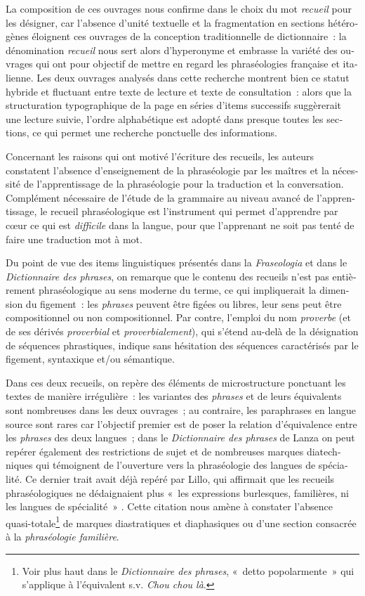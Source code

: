 \documentclass[output=paper,booklanguage=french]{langscibook}
\begin{document}
\begin{otherlanguage}{french}
La composition de ces ouvrages nous confirme dans le choix du mot \emph{recueil} pour les désigner, car l’absence d’unité textuelle et la fragmentation en sections hétérogènes éloignent ces ouvrages de la conception traditionnelle de dictionnaire~: la dénomination \emph{recueil} nous sert alors d’hyperonyme et embrasse la variété des ouvrages qui ont pour objectif de mettre en regard les phraséologies française et italienne. Les deux ouvrages analysés dans cette recherche montrent bien ce statut hybride et fluctuant entre texte de lecture et texte de consultation~: alors que la structuration typographique de la page en séries d’items successifs suggèrerait une lecture suivie, l’ordre alphabétique est adopté dans presque toutes les sections, ce qui permet une recherche ponctuelle des informations. 

Concernant les raisons qui ont motivé l’écriture des recueils, les auteurs constatent l’absence d’enseignement de la phraséologie par les maîtres et la nécessité de l’apprentissage de la phraséologie pour la traduction et la conversation. Complément nécessaire de l’étude de la grammaire au niveau avancé de l’apprentissage, le recueil phraséologique est l’instrument qui permet d’apprendre par cœur ce qui est \emph{difficile} dans la langue, pour que l’apprenant ne soit pas tenté de faire une traduction mot à mot. 

Du point de vue des items linguistiques présentés dans la \emph{Fraseologia} et dans le \emph{Dictionnaire des phrases}, on remarque que le contenu des recueils n’est pas entièrement phraséologique au sens moderne du terme, ce qui impliquerait la dimension du figement~: les \emph{phrases} peuvent être figées ou libres, leur sens peut être compositionnel ou non compositionnel. Par contre, l’emploi du nom \emph{proverbe} (et de ses dérivés \emph{proverbial} et \emph{proverbialement}), qui s’étend au-delà de la désignation de séquences phrastiques, indique sans hésitation des séquences caractérisés par le figement, syntaxique et/ou sémantique. 

Dans ces deux recueils, on repère des éléments de microstructure ponctuant les textes de manière irrégulière~: les variantes des \emph{phrases} et de leurs équivalents sont nombreuses dans les deux ouvrages~; au contraire, les paraphrases en langue source sont rares car l’objectif premier est de poser la relation d’équivalence entre les \emph{phrases} des deux langues~; dans le \emph{Dictionnaire des phrases} de Lanza on peut repérer également des restrictions de sujet et de nombreuses marques diatechniques qui témoignent de l’ouverture vers la phraséologie des langues de spécialité. Ce dernier trait avait déjà repéré par Lillo, qui affirmait que les recueils phraséologiques ne dédaignaient plus «~les expressions burlesques, familières, ni les langues de spécialité~» \citep[76]{Lillo1994}. Cette citation nous amène à constater l’absence quasi-totale\footnote{Voir plus haut dans le \emph{Dictionnaire des phrases}, «~detto popolarmente~» qui s’applique à l’équivalent s.v. \emph{Chou chou là}.} de marques diastratiques et diaphasiques ou d’une section consacrée à la \emph{phraséologie familière}.


\end{otherlanguage}
\end{document}
